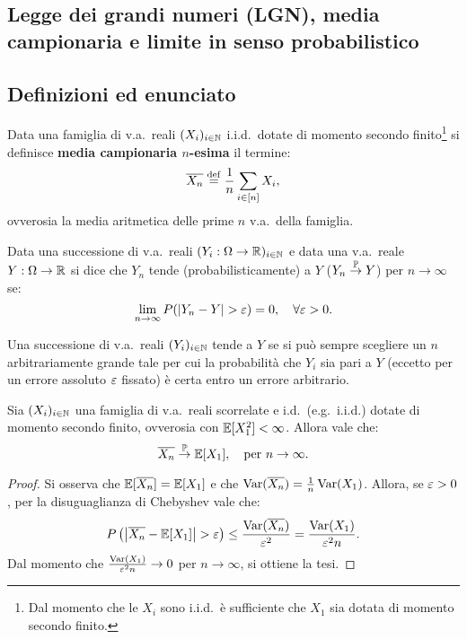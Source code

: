 \begin{multicols*}{2}
\section{Legge dei grandi numeri (LGN), media campionaria e limite in senso probabilistico}

\subsection{Definizioni ed enunciato}

\begin{definition}
    Data una famiglia di v.a.~reali $(X_i)_{i \in \mathbb{N}}$ i.i.d.~dotate di momento secondo
    finito\footnote{
        Dal momento che le $X_i$ sono i.i.d.~è sufficiente che $X_1$ sia dotata di
        momento secondo finito.
    } si definisce \textbf{media campionaria $n$-esima} il termine:
    \[
        \overline{X_n} \overset{\mathrm{def}}{=} \frac{1}{n} \sum_{i \in [n]} X_i, 
    \]
    ovverosia la media aritmetica delle prime $n$ v.a.~della famiglia.
\end{definition}

\begin{definition}
    Data una successione di v.a.~reali $(Y_i : \Omega \to \mathbb{R})_{i \in \mathbb{N}}$ e data
    una v.a.~reale $Y : \Omega \to \mathbb{R}$ si
    dice che $Y_n$ tende (probabilisticamente) a $Y$ ($Y_n \overset{\mathbb{P}}{\to} Y$) per $n \to \infty$
    se:
    \[
        \lim_{n \to \infty} P(\left\lvert Y_n - Y \right\rvert > \varepsilon) = 0, \quad \forall \varepsilon > 0.
    \]
\end{definition}

\begin{remark}
    Una successione di v.a.~reali $(Y_i)_{i \in \mathbb{N}}$ tende a $Y$ se si può
    sempre scegliere un $n$ arbitrariamente grande tale per cui la probabilità che $Y_i$
    sia pari a $Y$ (eccetto per un errore assoluto $\varepsilon$ fissato) è certa entro un
    errore arbitrario.
\end{remark}

\begin{theorem}
    Sia $(X_i)_{i \in \mathbb{N}}$ una famiglia di v.a.~reali scorrelate e i.d.~(e.g.~i.i.d.) dotate di momento secondo
    finito, ovverosia con $\mathbb{E}[X_1^2] < \infty$. Allora vale che:
    \[
        \overline{X_n} \overset{\mathbb{P}}{\to} \mathbb{E}[X_1], \quad \text{per } n \to \infty.
    \]
\end{theorem}

\begin{proof}
    Si osserva che $\mathbb{E}[\overline{X_n}] = \mathbb{E}[X_1]$ e che
    $\operatorname{Var}(\overline{X_n}) = \frac{1}{n} \operatorname{Var}(X_1)$. Allora, se $\varepsilon > 0$,
    per la disuguaglianza di Chebyshev vale che:
    \[
        P\left(\left\lvert \overline{X_n} - \mathbb{E}[X_1] \right\rvert > \varepsilon\right) \leq \frac{\operatorname{Var}(\overline{X_n})}{\varepsilon^2} =
        \frac{\operatorname{Var}(X_1)}{\varepsilon^2 n}.
    \]
    Dal momento che $\frac{\operatorname{Var}(X_1)}{\varepsilon^2 n} \to 0$ per $n \to \infty$, si ottiene
    la tesi.
\end{proof}


\end{multicols*}
